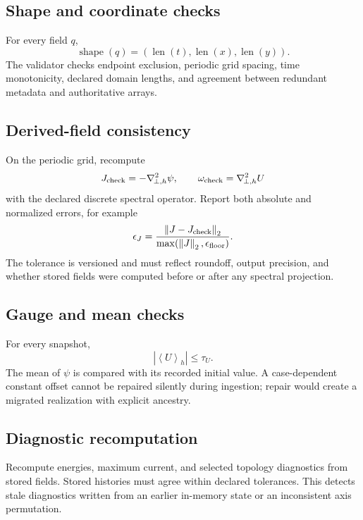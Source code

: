 \documentclass[11pt]{article}
\newcommand{\Laph}{\nabla_{\!\perp,h}^{2}}
\newcommand{\average}[1]{\left\langle #1\right\rangle}
\newcommand{\norm}[1]{\left\lVert #1\right\rVert}
\begin{document}
\subsection{Shape and coordinate checks}

For every field $q$,
\begin{equation}
\operatorname{shape}(q)
=(\operatorname{len}(t),\operatorname{len}(x),\operatorname{len}(y)).
\end{equation}
The validator checks endpoint exclusion, periodic grid spacing, time monotonicity, declared domain lengths, and agreement between redundant metadata and authoritative arrays.

\subsection{Derived-field consistency}

On the periodic grid, recompute
\begin{equation}
J_{\rm check}=-\Laph\psi,
\qquad
\omega_{\rm check}=\Laph U
\end{equation}
with the declared discrete spectral operator. Report both absolute and normalized errors, for example
\begin{equation}
\epsilon_J
=\frac{\norm{J-J_{\rm check}}_2}
{\max(\norm{J}_2,\epsilon_{\rm floor})}.
\end{equation}
The tolerance is versioned and must reflect roundoff, output precision, and whether stored fields were computed before or after any spectral projection.

\subsection{Gauge and mean checks}

For every snapshot,
\begin{equation}
|\average U_h|\le\tau_U.
\end{equation}
The mean of $\psi$ is compared with its recorded initial value. A case-dependent constant offset cannot be repaired silently during ingestion; repair would create a migrated realization with explicit ancestry.

\subsection{Diagnostic recomputation}

Recompute energies, maximum current, and selected topology diagnostics from stored fields. Stored histories must agree within declared tolerances. This detects stale diagnostics written from an earlier in-memory state or an inconsistent axis permutation.
\end{document}
